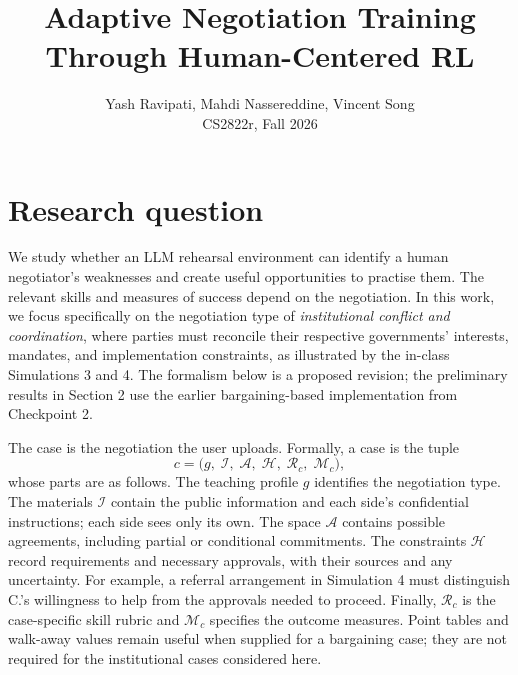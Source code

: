 \documentclass[11pt]{article}
\title{\vspace{-2.2em}Adaptive Negotiation Training Through Human-Centered RL}
\author{Yash Ravipati, Mahdi Nassereddine, Vincent Song \\ \small CS2822r, Fall 2026}
\date{\vspace{-1.2em}}
\makeatletter
\renewcommand\paragraph{\@startsection{paragraph}{4}{\z@}{0.7ex \@plus 0.3ex}{-1em}{\normalfont\normalsize\bfseries}}
\makeatother
\begin{document}
\maketitle

\section{Research question}

We study whether an LLM rehearsal environment can identify a human negotiator's
weaknesses and create useful opportunities to practise them. The relevant skills and
measures of success depend on the negotiation. In this work, we focus specifically on the negotiation type of \emph{institutional conflict and
coordination}, where parties must reconcile their respective governments' interests, mandates, and
implementation constraints, as illustrated by the in-class Simulations 3 and 4.
The formalism below is a proposed revision; the preliminary results in Section 2 use the
earlier bargaining-based implementation from Checkpoint 2.

\paragraph{1. The case $c$.}
The case is the negotiation the user uploads. Formally, a case is the tuple
\begin{equation}
c = \big(g,\; \mathcal{I},\; \mathcal{A},\; \mathcal{H},\; \mathcal{R}_c,\; \mathcal{M}_c\big),
\end{equation}
whose parts are as follows. The teaching profile $g$ identifies the negotiation type.
The materials $\mathcal{I}$ contain the public information and each side's confidential
instructions; each side sees only its own. The space $\mathcal{A}$ contains possible
agreements, including partial or conditional commitments. The constraints $\mathcal{H}$
record requirements and necessary approvals, with their sources and any uncertainty.
For example, a referral arrangement in Simulation 4 must distinguish C.'s willingness
to help from the approvals needed to proceed. Finally, $\mathcal{R}_c$ is the case-specific
skill rubric and $\mathcal{M}_c$ specifies the outcome measures. Point tables and walk-away
values remain useful when supplied for a bargaining case; they are not required for the
institutional cases considered here.
\end{document}
